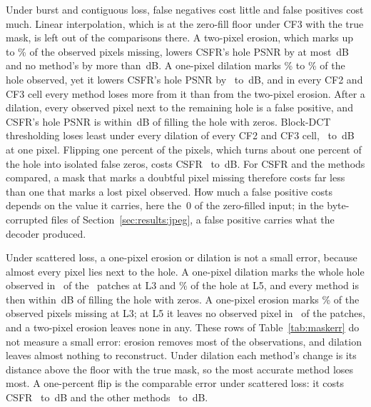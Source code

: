 \documentclass[final,3p]{elsarticle}
\begin{document}
Under burst and contiguous loss, false negatives cost little and false positives cost much. Linear interpolation, which is at the zero-fill floor under CF3 with the true mask, is left out of the comparisons there. A two-pixel erosion, which marks up to \maskErodeFnMax\% of the observed pixels missing, lowers CSFR's hole PSNR by at most \maskErodeCsfrMax\,dB and no method's by more than \maskErodeAnyMax\,dB. A one-pixel dilation marks \maskDilateFpMin\% to \maskDilateFpMax\% of the hole observed, yet it lowers CSFR's hole PSNR by \maskDilateCsfrMin\ to \maskDilateCsfrMax\,dB, and in every CF2 and CF3 cell every method loses more from it than from the two-pixel erosion. After a dilation, every observed pixel next to the remaining hole is a false positive, and CSFR's hole PSNR is within \maskDilateCsfrOverFloorMax\,dB of filling the hole with zeros. Block-DCT thresholding loses least under every dilation of every CF2 and CF3 cell, \maskDilateGulMin\ to \maskDilateGulMax\,dB at one pixel. Flipping one percent of the pixels, which turns about one percent of the hole into isolated false zeros, costs CSFR \maskFlipCsfrMin\ to \maskFlipCsfrMax\,dB. For CSFR and the methods compared, a mask that marks a doubtful pixel missing therefore costs far less than one that marks a lost pixel observed. How much a false positive costs depends on the value it carries, here the~0 of the zero-filled input; in the byte-corrupted files of Section~\ref{sec:results:jpeg}, a false positive carries what the decoder produced.

Under scattered loss, a one-pixel erosion or dilation is not a small error, because almost every pixel lies next to the hole. A one-pixel dilation marks the whole hole observed in \maskCFoneDilateAllObs\ of the \corpusGovN\ patches at L3 and \maskCFoneDilateFpLfive\% of the hole at L5, and every method is then within \maskCFoneDilateOverFloorMax\,dB of filling the hole with zeros. A one-pixel erosion marks \maskCFoneErodeFnLthree\% of the observed pixels missing at L3; at L5 it leaves no observed pixel in \maskCFoneErodeNoneLfive\ of the patches, and a two-pixel erosion leaves none in any. These rows of Table~\ref{tab:maskerr} do not measure a small error: erosion removes most of the observations, and dilation leaves almost nothing to reconstruct. Under dilation each method's change is its distance above the floor with the true mask, so the most accurate method loses most. A one-percent flip is the comparable error under scattered loss: it costs CSFR \maskCFoneFlipCsfrMin\ to \maskCFoneFlipCsfrMax\,dB and the other methods \maskCFoneFlipOtherMin\ to \maskCFoneFlipOtherMax\,dB.
\end{document}
